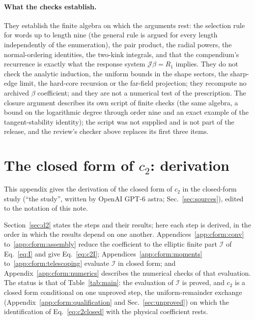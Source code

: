 \documentclass[11pt,a4paper]{article}
\numberwithin{equation}{section}
\newcommand{\cI}{\mathcal I}
\begin{document}
\paragraph{What the checks establish.} They establish the finite algebra on which the arguments rest: the selection
rule for words up to length nine (the general rule is argued for every length independently of the enumeration), the
pair product, the radial powers, the normal-ordering identities, the two-kink integrals, and that the compendium's
recurrence is exactly what the response system $\mathcal J\beta=R_1$ implies. They do not check the analytic
induction, the uniform bounds in the shape sectors, the sharp-edge limit, the hard-core recursion or the far-field
projection; they recompute no archived $\beta$ coefficient; and they are not a numerical test of the prescription. The
closure argument describes its own script of finite checks (the same algebra, a bound on the logarithmic degree
through order nine and an exact example of the tangent-stability identity); the script was not supplied and is not part
of the release, and the review's checker above replaces its first three items.

\section{The closed form of \texorpdfstring{$c_2$}{c2}: derivation}\label{app:cform}
This appendix gives the derivation of the closed form of $c_2$ in the closed-form study (``the study'', written by
OpenAI GPT-6 astra; Sec.~\ref{sec:sources}), edited to the notation of this note.

Section~\ref{sec:d2} states the steps and their results; here each step is derived, in the order in which the
results depend on one another. Appendices~\ref{app:cform:conv} to~\ref{app:cform:assembly} reduce the coefficient to
the elliptic finite part $\cI$ of Eq.~\eqref{eq:I} and give Eq.~\eqref{eq:c2I};
Appendices~\ref{app:cform:moments} to~\ref{app:cform:telescoping} evaluate $\cI$ in closed form; and
Appendix~\ref{app:cform:numerics} describes the numerical checks of that evaluation. The status is that of
Table~\ref{tab:main}: the evaluation of $\cI$ is proved, and $c_2$ is a closed form conditional on one unproved step,
the uniform-remainder exchange (Appendix~\ref{app:cform:qualification} and Sec.~\ref{sec:unproved}) on which the
identification of Eq.~\eqref{eq:c2closed} with the physical coefficient rests.
\end{document}

